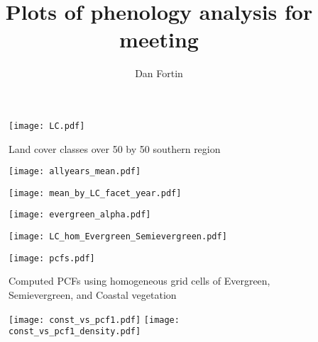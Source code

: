 \documentclass[11pt, oneside]{article}   	%
\title{Plots of phenology analysis for meeting }
\author{Dan Fortin}
\begin{document}
\maketitle

\begin{figure}[htbp] %
   \centering
   \texttt{[image: LC.pdf]} 
   \caption{Land cover classes over 50 by 50 southern region}
   \label{fig:example}
\end{figure}

\begin{figure}[htbp] %
   \centering
   \texttt{[image: allyears\_mean.pdf]} 
   \caption{}
   \label{fig:example}
\end{figure}

\begin{figure}[htbp] %
   \centering
   \texttt{[image: mean\_by\_LC\_facet\_year.pdf]} 
   \caption{}
   \label{fig:example}
\end{figure}

\begin{figure}[htbp] %
   \centering
   \texttt{[image: evergreen\_alpha.pdf]} 
   \caption{}
   \label{fig:example}
\end{figure}

\begin{figure}[htbp] %
   \centering
   \texttt{[image: LC\_hom\_Evergreen\_Semievergreen.pdf]} 
   \caption{}
   \label{fig:example}
\end{figure}

\begin{figure}[htbp] %
   \centering
   \texttt{[image: pcfs.pdf]} 
   \caption{Computed PCFs using homogeneous grid cells of Evergreen, Semievergreen, and Coastal vegetation}
   \label{fig:example}
\end{figure}

\begin{figure}[htbp] %
   \centering
   \texttt{[image: const\_vs\_pcf1.pdf]} 
   \texttt{[image: const\_vs\_pcf1\_density.pdf]} 
   \caption{}
   \label{fig:example}
\end{figure}
\end{document}
